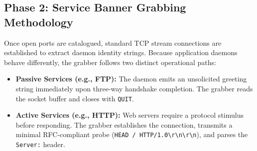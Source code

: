 \subsection{Phase 2: Service Banner Grabbing Methodology}
Once open ports are catalogued, standard TCP stream connections are established to extract daemon
identity strings. Because application daemons behave differently, the grabber follows two distinct
operational paths:
\begin{itemize}
    \item \textbf{Passive Services (e.g., FTP):} The daemon emits an unsolicited greeting string
    immediately upon three-way handshake completion. The grabber reads the socket buffer and closes
    with \texttt{QUIT}.
    \item \textbf{Active Services (e.g., HTTP):} Web servers require a protocol stimulus before
    responding. The grabber establishes the connection, transmits a minimal RFC-compliant probe
    (\texttt{HEAD / HTTP/1.0\textbackslash r\textbackslash n\textbackslash r\textbackslash n}), and
    parses the \texttt{Server:} header.
\end{itemize}

